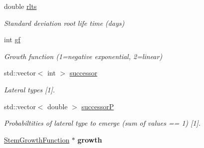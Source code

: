 \begin{DoxyCompactItemize}
\mbox{\label{classCPlantBox_1_1StemRandomOrganParameter_a7ab136297d276f84895eee2fe33e8641}} 
double \hyperlink{classCPlantBox_1_1StemRandomOrganParameter_a7ab136297d276f84895eee2fe33e8641}{rlts}
\begin{DoxyCompactList}\small\item\em Standard deviation root life time (days) \end{DoxyCompactList}\item 
\mbox{\label{classCPlantBox_1_1StemRandomOrganParameter_a585bdb4319eb12a34240375230b332b9}} 
int \hyperlink{classCPlantBox_1_1StemRandomOrganParameter_a585bdb4319eb12a34240375230b332b9}{gf}
\begin{DoxyCompactList}\small\item\em Growth function (1=negative exponential, 2=linear) \end{DoxyCompactList}\item 
\mbox{\label{classCPlantBox_1_1StemRandomOrganParameter_ad3480f8e2d1c4ab518e83a50b7258d9c}} 
std\+::vector$<$ int $>$ \hyperlink{classCPlantBox_1_1StemRandomOrganParameter_ad3480f8e2d1c4ab518e83a50b7258d9c}{successor}
\begin{DoxyCompactList}\small\item\em Lateral types \mbox{[}1\mbox{]}. \end{DoxyCompactList}\item 
\mbox{\label{classCPlantBox_1_1StemRandomOrganParameter_a6d65fed991b23511586017da99cfbeb0}} 
std\+::vector$<$ double $>$ \hyperlink{classCPlantBox_1_1StemRandomOrganParameter_a6d65fed991b23511586017da99cfbeb0}{successorP}
\begin{DoxyCompactList}\small\item\em Probabiltities of lateral type to emerge (sum of values == 1) \mbox{[}1\mbox{]}. \end{DoxyCompactList}\item 
\mbox{\label{classCPlantBox_1_1StemRandomOrganParameter_a490287c3a8185effdbcde1f4544f2f4b}} 
\hyperlink{classCPlantBox_1_1StemGrowthFunction}{Stem\+Growth\+Function} $\ast$ {\bfseries growth}
\item 

\end{DoxyCompactItemize}
